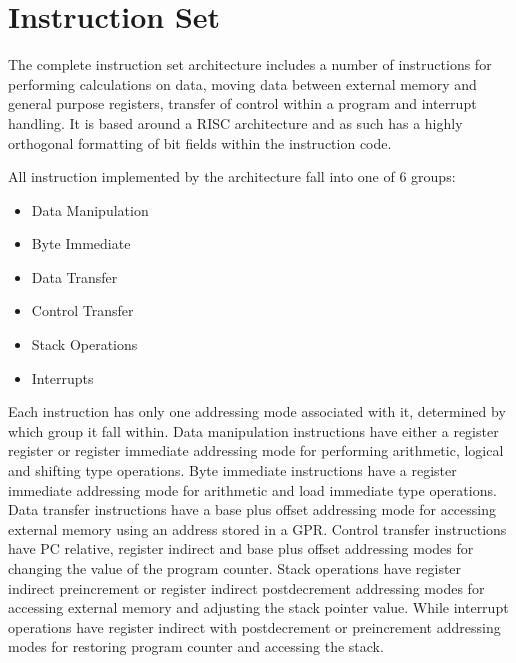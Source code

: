 
\newpage
\section{Instruction Set}

The complete instruction set architecture includes a number of instructions for performing calculations on data, moving data between external memory and general purpose registers, transfer of control within a program and interrupt handling. 
It is based around a RISC architecture and as such has a highly orthogonal formatting of bit fields within the instruction code. 

All instruction implemented by the architecture fall into one of 6 groups:
\begin{itemize}
	\item Data Manipulation
	\item Byte Immediate
	\item Data Transfer
	\item Control Transfer
	\item Stack Operations
	\item Interrupts
\end{itemize}

Each instruction has only one addressing mode associated with it, determined by which group it fall within. Data manipulation instructions have either a register register or register immediate addressing mode for performing arithmetic, logical and shifting type operations. Byte immediate instructions have a register immediate addressing mode for arithmetic and load immediate type operations. Data transfer instructions have a base plus offset addressing mode for accessing external memory using an address stored in a GPR. Control transfer instructions have PC relative, register indirect and base plus offset addressing modes for changing the value of the program counter. Stack operations have register indirect preincrement or register indirect postdecrement addressing modes for accessing external memory and adjusting the stack pointer value. While interrupt operations have register indirect with postdecrement or preincrement addressing modes for restoring program counter and accessing the stack.
\newpage

